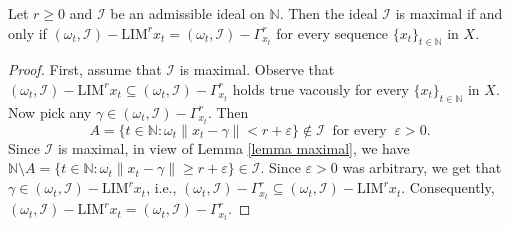 \documentclass[reqno]{amsart}
\begin{document}
{\begin{theorem}\label{maximal ideal}
Let $r\geq 0$ and  $\mathcal{I}$ be an admissible ideal on $\mathbb{N}$. Then the ideal $\mathcal{I}$ is maximal if and only if $(\omega_t,\mathcal{I})-\text{LIM}^{r} x_t=(\omega_t,\mathcal{I})-\Gamma_{x_t}^r$ for every sequence $\{x_t\}_{t\in\mathbb{N}}$ in $X$.
\end{theorem}
\begin{proof}
	First, assume that $\mathcal{I}$ is maximal. Observe that 
	$
	(\omega_t,\mathcal{I})-\text{LIM}^{r} x_t\subseteq(\omega_t,\mathcal{I})-\Gamma_{x_t}^r
	$ holds true vacously for every $\{x_t\}_{t\in\mathbb{N}}$ in $X$. Now pick any $\gamma\in (\omega_t,\mathcal{I})-\Gamma_{x_t}^r$. Then 
	$$
	A=\{t\in\mathbb{N}:\omega_t\|x_t-\gamma\|<r+\varepsilon\}\notin\mathcal{I}~\mbox{ for every }~\varepsilon>0.
	$$
	Since $\mathcal{I}$ is maximal, in view of Lemma \ref{lemma maximal}, we  have $\mathbb{N}\setminus A=\{t\in\mathbb{N}:\omega_t\|x_t-\gamma\|\geq r+\varepsilon\}\in\mathcal{I}$.  Since $\varepsilon>0$ was arbitrary, we get that $\gamma\in 	(\omega_t,\mathcal{I})-\text{LIM}^{r} x_t$, i.e., $(\omega_t,\mathcal{I})-\Gamma_{x_t}^r\subseteq(\omega_t,\mathcal{I})-\text{LIM}^{r} x_t$.
	Consequently, $(\omega_t,\mathcal{I})-\text{LIM}^{r} x_t=(\omega_t,\mathcal{I})-\Gamma_{x_t}^r$.
	

\end{proof}}
\end{document}

